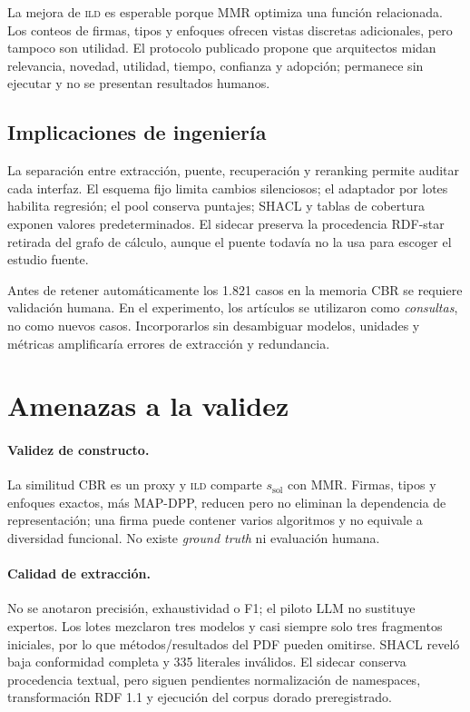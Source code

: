 \documentclass[11pt,a4paper]{article}
\newcommand{\ILD}{\textsc{ild}}
\begin{document}
La mejora de \ILD{} es esperable porque MMR optimiza una función relacionada. Los conteos de firmas, tipos y enfoques ofrecen vistas discretas adicionales, pero tampoco son utilidad. El protocolo publicado propone que arquitectos midan relevancia, novedad, utilidad, tiempo, confianza y adopción; permanece sin ejecutar y no se presentan resultados humanos.

\subsection{Implicaciones de ingeniería}

La separación entre extracción, puente, recuperación y reranking permite auditar cada interfaz. El esquema fijo limita cambios silenciosos; el adaptador por lotes habilita regresión; el pool conserva puntajes; SHACL y tablas de cobertura exponen valores predeterminados. El sidecar preserva la procedencia RDF-star retirada del grafo de cálculo, aunque el puente todavía no la usa para escoger el estudio fuente.

Antes de retener automáticamente los 1.821 casos en la memoria CBR se requiere validación humana. En el experimento, los artículos se utilizaron como \emph{consultas}, no como nuevos casos. Incorporarlos sin desambiguar modelos, unidades y métricas amplificaría errores de extracción y redundancia.

\section{Amenazas a la validez}
\label{sec:threats}

\paragraph{Validez de constructo.}
La similitud CBR es un proxy y \ILD{} comparte $s_{\mathrm{sol}}$ con MMR. Firmas, tipos y enfoques exactos, más MAP-DPP, reducen pero no eliminan la dependencia de representación; una firma puede contener varios algoritmos y no equivale a diversidad funcional. No existe \emph{ground truth} ni evaluación humana.

\paragraph{Calidad de extracción.}
No se anotaron precisión, exhaustividad o F1; el piloto LLM no sustituye expertos. Los lotes mezclaron tres modelos y casi siempre solo tres fragmentos iniciales, por lo que métodos/resultados del PDF pueden omitirse. SHACL reveló baja conformidad completa y 335 literales inválidos. El sidecar conserva procedencia textual, pero siguen pendientes normalización de namespaces, transformación RDF 1.1 y ejecución del corpus dorado preregistrado.
\end{document}
